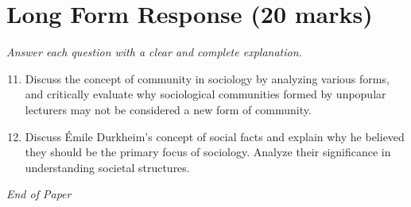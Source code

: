 \documentclass[12pt]{article}
\begin{document}
\section*{Long Form Response (20 marks)}
\textit{Answer each question with a clear and complete explanation.}
\begin{enumerate}[label=\arabic*.]
\setcounter{enumi}{10}
\item Discuss the concept of community in sociology by analyzing various forms, and critically evaluate why sociological communities formed by unpopular lecturers may not be considered a new form of community.
\item Discuss Émile Durkheim's concept of social facts and explain why he believed they should be the primary focus of sociology. Analyze their significance in understanding societal structures.
\end{enumerate}

\vfill
\noindent\textit{End of Paper}
\end{document}
